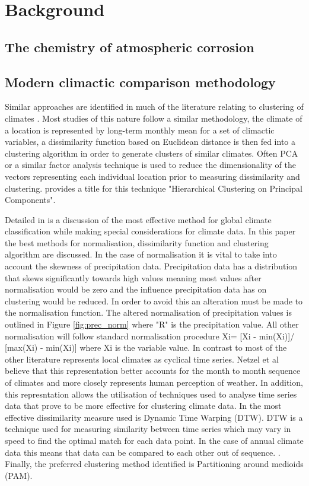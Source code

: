 \documentclass{article}
\begin{document}
\section{Background}

\subsection{The chemistry of atmospheric corrosion}

\subsection{Modern climactic comparison methodology}
Similar approaches are identified in much of the literature relating to clustering of climates \citep{Praene2019, Netzel2016, Kozjek2017, Park2019, Gonencgil2020}. Most studies of this nature follow a similar methodology, the climate of a location is represented by long-term monthly mean for a set of climactic variables, a dissimilarity function based on Euclidean distance is then fed into a clustering algorithm in order to generate clusters of similar climates. Often PCA or a similar factor analysis technique is used to reduce the dimensionality of the vectors representing each individual location prior to measuring dissimilarity and clustering. \citet{Praene2019} provides a title for this technique "Hierarchical Clustering on Principal Components".

Detailed in \citet{Netzel2016} is a discussion of the most effective method for global climate classification while making special considerations for climate data. In this paper the best methods for normalisation, dissimilarity function and clustering algorithm are discussed. In the case of normalisation it is vital to take into account the skewness of precipitation data. Precipitation data has a distribution that skews significantly towards high values meaning most values after normalisation would be zero and the influence precipitation data has on clustering would be reduced. In order to avoid this an alteration must be made to the normalisation function. The altered normalisation of precipitation values is outlined in Figure \ref{fig:prec_norm} where "R" is the precipitation value. All other normalisation will follow standard normalisation procedure Xi= [Xi - min(Xi)]/ [max(Xi) - min(Xi)] where Xi is the variable value. In contrast to most of the other literature \citet{Netzel2016} represents local climates as cyclical time series. Netzel et al believe that this representation better accounts for the month to month sequence of climates and more closely represents human perception of weather. In addition, this represntation allows the utilisation of techniques used to analyse time series data that prove to be more effective for clustering climate data. In \citet{Netzel2016} the most effective dissimilarity measure used is Dynamic Time Warping (DTW). DTW is a technique used for measuring similarity between time series which may vary in speed to find the optimal match for each data point.  In the case of annual climate data this means that data can be compared to each other out of sequence. . Finally, the preferred clustering method identified is Partitioning around medioids (PAM). 
\end{document}
